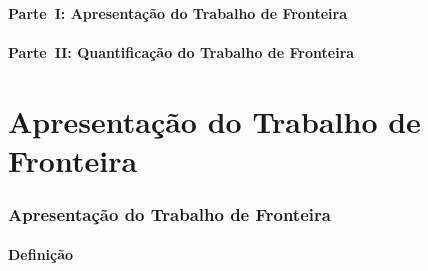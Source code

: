 \subsection{Parte~I: Apresentação do Trabalho de Fronteira}


\subsection{Parte~II: Quantificação do Trabalho de Fronteira}


\part{Apresentação do Trabalho de Fronteira}
\frame{\partpage}

\section{Apresentação do Trabalho de Fronteira}

\subsection{Definição}

